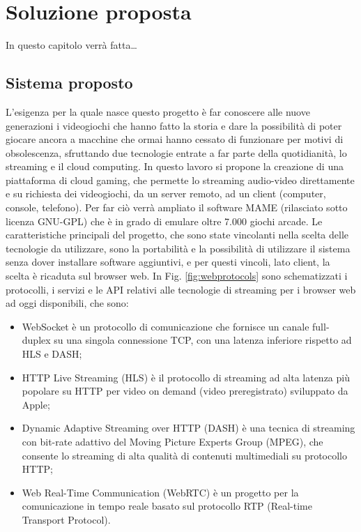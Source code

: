 %
%

\chapter{Soluzione proposta}
In questo capitolo verrà fatta\dots



\section{Sistema proposto}
L'esigenza per la quale nasce questo progetto è far conoscere alle nuove generazioni i videogiochi che hanno fatto la storia e dare la possibilità di poter giocare ancora a macchine che ormai hanno cessato di funzionare per motivi di obsolescenza, sfruttando due tecnologie entrate a far parte della quotidianità, lo streaming e il cloud computing. In questo lavoro si propone la creazione di una piattaforma di cloud gaming, che permette lo streaming audio-video direttamente e su richiesta dei videogiochi, da un server remoto, ad un client (computer, console, telefono). Per far ciò verrà ampliato il software MAME (rilasciato sotto licenza GNU-GPL) che è in grado di emulare oltre 7.000 giochi arcade. Le caratteristiche principali del progetto, che sono state vincolanti nella scelta delle tecnologie da utilizzare, sono la portabilità e la possibilità di utilizzare il sistema senza dover installare software aggiuntivi, e per questi vincoli, lato client, la scelta è ricaduta sul browser web. In Fig. \ref{fig:webprotocols} sono schematizzati i protocolli, i servizi e le API relativi alle tecnologie di streaming per i browser web ad oggi disponibili\cite{Audio_and_video_delivery}, che sono:

\begin{itemize}
	\item WebSocket è un protocollo di comunicazione che fornisce un canale full-duplex su una singola connessione TCP, con una latenza inferiore rispetto ad HLS e DASH;
	\item HTTP Live Streaming (HLS) è il protocollo di streaming ad alta latenza più popolare su HTTP per video on demand (video preregistrato) sviluppato da Apple;
	\item Dynamic Adaptive Streaming over HTTP (DASH) è una tecnica di streaming con bit-rate adattivo del Moving Picture Experts Group (MPEG), che consente lo streaming di alta qualità di contenuti multimediali su protocollo HTTP;
	\item Web Real-Time Communication (WebRTC) è un progetto per la comunicazione in tempo reale basato sul protocollo RTP (Real-time Transport Protocol)\cite{High_Performance_Browser_Networking}.
\end{itemize}

